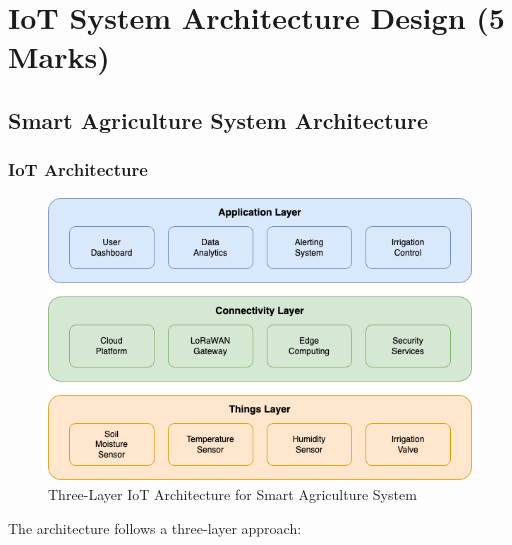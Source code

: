\documentclass[12pt,a4paper]{article}
\begin{document}
\section{IoT System Architecture Design (5 Marks)}

\subsection{Smart Agriculture System Architecture}

\subsubsection{IoT Architecture}

\begin{figure}[H]
\centering
\includegraphics[width=\textwidth]{img/drawio/three_layer_architecture.png}
\caption{Three-Layer IoT Architecture for Smart Agriculture System}
\label{fig:architecture}
\end{figure}

The architecture follows a three-layer approach:
\end{document}
